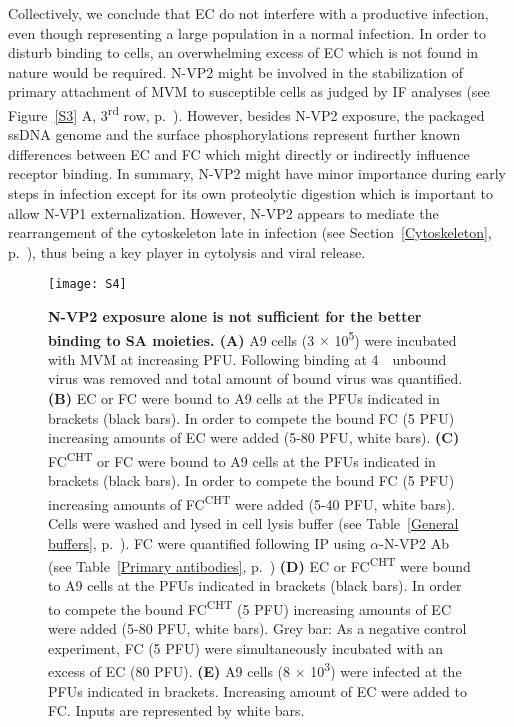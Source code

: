 Collectively, we conclude that EC do not interfere with a productive infection, even though representing a large population in a normal infection. In order to disturb binding to cells, an overwhelming excess of EC which is not found in nature would be required. N-VP2 might be involved in the stabilization of primary attachment of MVM to susceptible cells as judged by IF analyses (see Figure~\ref{S3} A, 3\textsuperscript{rd} row, p.~\pageref{S3}). However, besides N-VP2 exposure, the packaged ssDNA genome and the surface phosphorylations represent further known differences between EC and FC which might directly or indirectly influence receptor binding. In summary, N-VP2 might have minor importance during early steps in infection except for its own proteolytic digestion which is important to allow N-VP1 externalization. However, N-VP2 appears to mediate the rearrangement of the cytoskeleton late in infection (see Section~\ref{Cytoskeleton}, p.~\pageref{Cytoskeleton}), thus being a key player in cytolysis and viral release.        



\begin{figure}
\centering
  \texttt{[image: S4]} \\[0.3cm]
  \caption[N-VP2 Exposure Alone is not Sufficient for the Better Binding to Sialic Acid Moieties]
   {\textbf{N-VP2 exposure alone is not sufficient for the better binding to SA moieties. (A)} A9 cells (3 $\times$ 10\textsuperscript{5}) were incubated with MVM at increasing PFU. Following binding at \mbox{4 \textcelsius}~unbound virus was removed and total amount of bound virus was quantified. \textbf{(B)} EC or FC were bound to A9 cells at the PFUs indicated in brackets (black bars). In order to compete the bound FC (5 PFU) increasing amounts of EC were added (5-80 PFU, white bars). \textbf{(C)} FC\textsuperscript{CHT} or FC were bound to A9 cells at the PFUs indicated in brackets (black bars). In order to compete the bound FC (5 PFU) increasing amounts of FC\textsuperscript{CHT} were added (5-40 PFU, white bars). Cells were washed and lysed in cell lysis buffer (see Table~\ref{General buffers}, p.~\pageref{General buffers}). FC were quantified following IP using $\alpha$-N-VP2 Ab (see Table~\ref{Primary antibodies}, p.~\pageref{Primary antibodies}) \textbf{(D)} EC or FC\textsuperscript{CHT} were bound to A9 cells at the PFUs indicated in brackets (black bars). In order to compete the bound FC\textsuperscript{CHT} (5 PFU) increasing amounts of EC were added (5-80 PFU, white bars). Grey bar: As a negative control experiment, FC (5 PFU) were simultaneously incubated with an excess of EC (80 PFU). \textbf{(E)} A9 cells (8 $\times$ 10\textsuperscript{3}) were infected at the PFUs indicated in brackets. Increasing amount of EC were added to FC. Inputs are represented by white bars.} 
\label{S4}
\end{figure}

